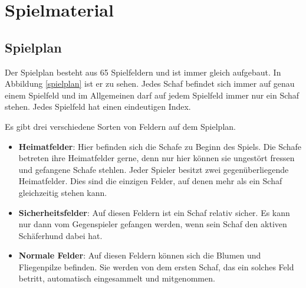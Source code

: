 \documentclass[11pt,pointlessnumbers,DIV10,BCOR10mm,tocleft]{scrreprt}
\begin{document}
\section{Spielmaterial}
\subsection{Spielplan}
Der Spielplan besteht aus 65 Spielfeldern und ist immer gleich aufgebaut. In Abbildung \ref{spielplan} ist er zu sehen. Jedes Schaf befindet sich immer auf genau einem Spielfeld und im Allgemeinen darf auf jedem Spielfeld immer nur ein Schaf stehen. Jedes Spielfeld hat einen eindeutigen Index.

Es gibt drei verschiedene Sorten von Feldern auf dem Spielplan.

\begin{itemize}
\item \textbf{Heimatfelder}: Hier befinden sich die Schafe zu Beginn des Spiels. Die Schafe betreten ihre Heimatfelder gerne, denn nur hier können sie ungestört fressen und gefangene Schafe stehlen. Jeder Spieler besitzt zwei gegenüberliegende Heimatfelder. Dies sind die einzigen Felder, auf denen mehr als ein Schaf gleichzeitig stehen kann.

\item \textbf{Sicherheitsfelder}: Auf diesen Feldern ist ein Schaf relativ sicher. Es kann nur dann vom Gegenspieler gefangen werden, wenn sein Schaf den aktiven Schäferhund dabei hat.

\item \textbf{Normale Felder}: Auf diesen Feldern können sich die Blumen und Fliegenpilze befinden. Sie werden von dem ersten Schaf, das ein solches Feld betritt, automatisch eingesammelt und mitgenommen.
\end{itemize}
\end{document}
